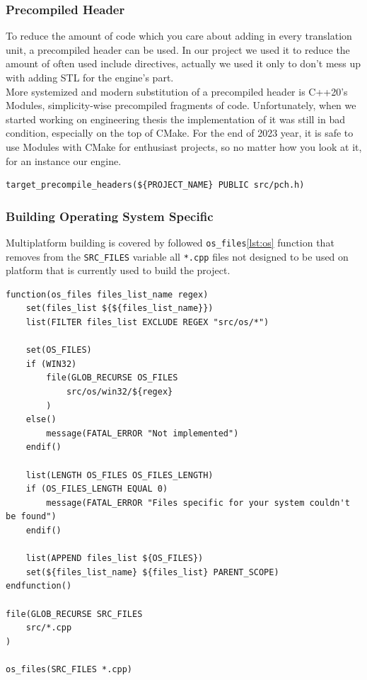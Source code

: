 \subsubsection{Precompiled Header}
\hspace{\parindent} To reduce the amount of code which you care about adding in every translation unit, a precompiled header can be used. In our project we used it to reduce the amount of often used include directives, actually we used it only to don't mess up with adding STL for the engine's part.\\
More systemized and modern substitution of a precompiled header is C++20's Modules, simplicity-wise precompiled fragments of code. Unfortunately, when we started working on engineering thesis the implementation of it was still in bad condition, especially on the top of CMake. For the end of 2023 year, it is safe to use Modules with CMake for enthusiast projects, so no matter how you look at it, for an instance our engine.

\begin{lstlisting}[caption=Adding precompiled header(./engine/CMakeLists.txt)]
target_precompile_headers(${PROJECT_NAME} PUBLIC src/pch.h)
\end{lstlisting}

\subsubsection{Building Operating System Specific}
\label{sec:build_os}
\hspace{\parindent} Multiplatform building is covered by followed \texttt{os\_files}\ref{lst:os} function that removes from the \texttt{SRC\_FILES} variable all \texttt{*.cpp} files not designed to be used on platform that is currently used to build the project.
\label{lst:os}
\begin{lstlisting}[caption=os\_files function (./engine/CMakeLists.txt)]
function(os_files files_list_name regex)
    set(files_list ${${files_list_name}})
    list(FILTER files_list EXCLUDE REGEX "src/os/*")

    set(OS_FILES)
    if (WIN32)
        file(GLOB_RECURSE OS_FILES
            src/os/win32/${regex}
        )
    else()
        message(FATAL_ERROR "Not implemented")
    endif()

    list(LENGTH OS_FILES OS_FILES_LENGTH)
    if (OS_FILES_LENGTH EQUAL 0)
        message(FATAL_ERROR "Files specific for your system couldn't be found")
    endif()

    list(APPEND files_list ${OS_FILES})
    set(${files_list_name} ${files_list} PARENT_SCOPE)
endfunction()

file(GLOB_RECURSE SRC_FILES
    src/*.cpp
)

os_files(SRC_FILES *.cpp)
\end{lstlisting}

